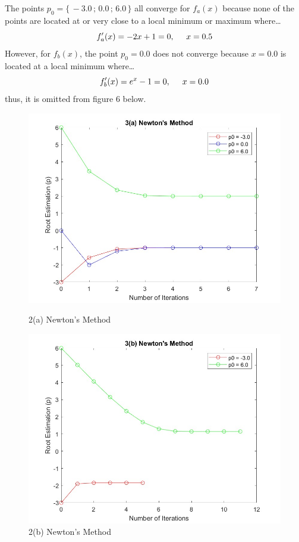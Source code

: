 \documentclass[12pt,letterpaper]{article}
\begin{document}
\begin{enumerate}
The points $p_{0} =\{\,-3.0\,;\,0.0\,;\,6.0\,\}$ all converge for $f_{a}(x)$ because none of the points are located at or very close to a local minimum or maximum where\ldots
\begin{equation}
    f'_{a}(x) = -2x + 1 = 0, \hspace*{0.5cm} x=0.5
\end{equation}
However, for $f_{b}(x)$, the point $p_{0}=0.0$ does not converge because $x=0.0$ is located at a local minimum where\ldots
\begin{equation}
    f'_{b}(x) = e^x - 1 = 0, \hspace*{0.5cm} x=0.0
\end{equation}
thus, it is omitted from figure 6 below.

\pagebreak
\begin{figure}[!h]
    \centering
    \includegraphics[width = 0.8\linewidth]{3a_newtons_method.jpg}
    \caption{2(a)\: Newton's Method}\label{fig:3a_newtons_method}
    \includegraphics[width = 0.8\linewidth]{3b_newtons_method.jpg}
    \caption{2(b)\: Newton's Method}\label{fig:3b_newtons_method}
\end{figure}

\end{enumerate}
\end{document}
